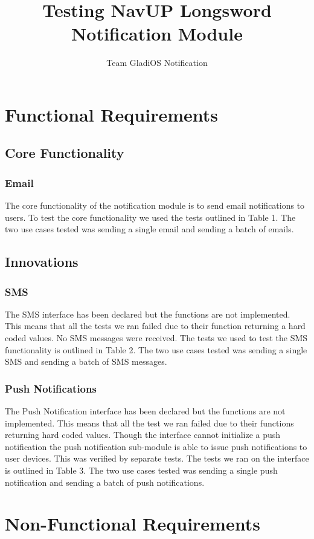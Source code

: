 \documentclass[11pt]{article}
\author{Team GladiOS Notification}
\title{Testing NavUP Longsword Notification Module}
\begin{document}
	\setlength{\parskip}{6pt}
	
	
	
	\tableofcontents
	
	\newpage
	
	\section{Functional Requirements}
	\subsection{Core Functionality}
	\subsubsection{Email}
	The core functionality of the notification module is to send email notifications to users. To test the core functionality we used the tests outlined in Table 1.
	The two use cases tested was sending a single email and sending a batch of emails.
	\subsection{Innovations}
	\subsubsection{SMS}
	The SMS interface has been declared but the functions are not implemented. This means that all the tests we ran failed due to their function returning a hard coded values. No SMS messages were received. The tests we used to test the SMS functionality is outlined in Table 2. The two use cases tested was sending a single SMS and sending a batch of SMS messages.
	\subsubsection{Push Notifications}
	The Push Notification interface has been declared but the functions are not implemented. This means that all the test we ran failed due to their functions returning hard coded values. Though the interface cannot initialize a push notification the push notification sub-module is able to issue push notifications to user devices. This was verified by separate tests. The tests we ran on the interface is outlined in Table 3. The two use cases tested was sending a single push notification and sending a batch of push notifications.
	
	\section{Non-Functional Requirements}
\end{document}
